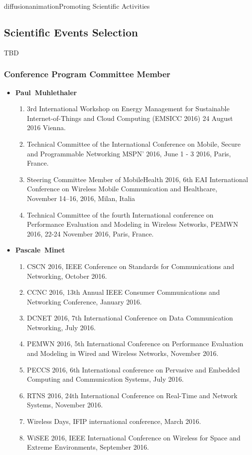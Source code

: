 \documentclass{ra2016}
\newcommand{\paul}  {\textbf{Paul~Muhlethaler}}
\newcommand{\pascale} {\textbf{Pascale~Minet}}
\begin{document}
\begin{module}{diffusion}{animation}{Promoting Scientific Activities}
    
\subsection {Scientific Events Selection}

TBD 

 \subsubsection {Conference Program Committee Member}

\begin{itemize}
    \item \paul
        \begin{enumerate}
             \item 3rd International Workshop on Energy Management for Sustainable Internet-of-Things and Cloud Computing (EMSICC 2016) 24 August 2016 Vienna. 
             \item Technical Committee of the International Conference on Mobile, Secure and Programmable Networking MSPN' 2016, June 1 - 3 2016, Paris, France. 
            \item Steering Committee Member of MobileHealth 2016, 6th  EAI International Conference on Wireless Mobile Communication and Healthcare,  November 14–16, 2016, Milan, Italia   
            \item Technical Committee of the fourth International conference on Performance Evaluation and Modeling in Wireless Networks, PEMWN 2016, 22-24 November 2016, Paris, France. 
        \end{enumerate}
    \item \pascale
        \begin{enumerate}
        \item CSCN 2016,  IEEE  Conference on Standards for Communications and Networking, October 2016.
        \item CCNC 2016, 13th Annual IEEE Consumer Communications and Networking Conference, January 2016.
        \item DCNET 2016, 7th International Conference on Data Communication Networking, July 2016.
        \item PEMWN 2016, 5th International Conference on Performance Evaluation and Modeling in Wired and Wireless Networks, November 2016.
       \item PECCS 2016, 6th International conference on Pervasive and Embedded Computing and Communication Systems, July 2016.
       \item RTNS 2016, 24th International Conference on Real-Time and Network Systems, November 2016.
       \item Wireless Days, IFIP international conference, March 2016.
\item WiSEE 2016, IEEE International Conference on Wireless for Space and Extreme Environments, September 2016.
          \end{enumerate}
        

\end{itemize}
\end{module}
\end{document}
